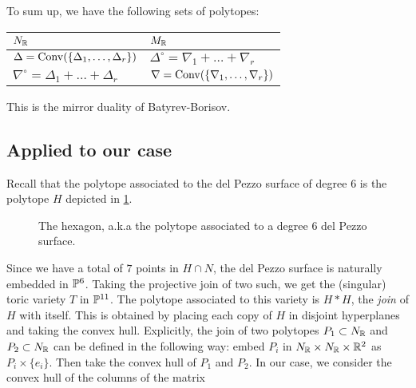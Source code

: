 \documentclass[11pt, english]{article}
\begin{document}
To sum up, we have the following sets of polytopes:

\begin{center}
\begin{tabular}{l l}
  $N_{\mathbb{R}}$ & $M_{\mathbb{R}}$ \\
\hline
 $\Delta=\operatorname{Conv}(\{\Delta_1,\ldots,\Delta_r\})$ & $\Delta^\circ=\nabla_1+\ldots+\nabla_r$ \\
$\nabla^\circ = \Delta_1+\ldots+\Delta_r$ & $\nabla=\operatorname{Conv}(\{\nabla_1,\ldots,\nabla_r\})$ \\

\end{tabular}
\end{center}

This is the mirror duality of Batyrev-Borisov.

\subsection{Applied to our case}

Recall that the polytope associated to the del Pezzo surface of degree $6$ is the polytope $H$ depicted in \ref{fig:hexagon}. 

\begin{figure}[ht]
\label{fig:hexagon}
\centering
{}
\caption{The hexagon, a.k.a the polytope associated to a degree 6 del Pezzo surface.}
\end{figure}
 
Since we have a total of $7$ points in $H \cap N$, the del Pezzo surface is naturally embedded in $\mathbb{P}^6$. Taking the projective join of two such, we get the (singular) toric variety $T$ in $\mathbb{P}^{11}$. The polytope associated to this variety is $H \ast H$, the \emph{join} of $H$ with itself. This is obtained by placing each copy of $H$ in disjoint hyperplanes and taking the convex hull. Explicitly, the join of two polytopes $P_1 \subset N_{\mathbb{R}}$ and $P_2 \subset N_{\mathbb{R}}$ can be defined in the following way: embed $P_i$ in $N_{\mathbb{R}} \times N_{\mathbb{R}} \times \mathbb{R}^2$ as $P_i \times \{e_i\}$. Then take the convex hull of $P_1$ and $P_2$. In our case, we consider the convex hull of the columns of the  matrix
\end{document}
